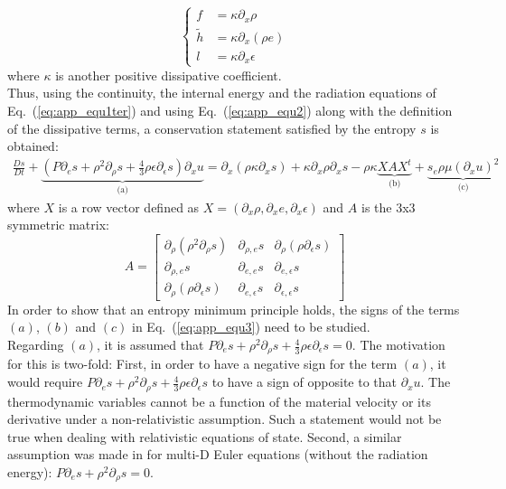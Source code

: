 \documentclass[review]{elsarticle}
\newcommand{\eqt}[1]{Eq.~(\ref{#1})}                     %
\begin{document}
\begin{appendices}
 \begin{equation}
 \left\{
 \begin{array}{ccc}
f &= \kappa \partial_x \rho \\
\tilde{h} &= \kappa \partial_x (\rho e) \\
l &= \kappa \partial_x \epsilon
 \end{array}
 \right.
 \end{equation}
 where $\kappa$ is another positive dissipative coefficient. \\
 Thus, using the continuity, the internal energy and the radiation equations of \eqt{eq:app_equ1ter} and using \eqt{eq:app_equ2} along with the definition of the dissipative terms, a conservation statement satisfied by the entropy $s$ is obtained:
 \begin{eqnarray}
 \label{eq:app_equ3}
 \frac{Ds}{Dt} + \underbrace{\left( P \partial_e s + \rho^2 \partial_{\rho} s + \frac{4}{3} \rho \epsilon \partial_{\epsilon} s \right) \partial_x u}_\textrm{(a)} = \partial_x \left( \rho \kappa \partial_x s \right) + \kappa \partial_x \rho \partial_x s - \rho \kappa \underbrace{X A X^t}_\textrm{(b)} + \underbrace{ s_e \rho \mu (\partial_x u)^2}_\textrm{(c)}
 \end{eqnarray}
 where $X$ is a row vector defined as $X=\left( \partial_x \rho, \partial_x e, \partial_x \epsilon \right)$ and $A$ is the $3$x$3$ symmetric matrix:
 \begin{equation}
 A = 
 \left[
 \begin{array}{ccc}
\partial_{\rho} \left( \rho^2 \partial_{\rho} s \right) & \partial_{\rho,e} s & \partial_{\rho} \left( \rho \partial_{\epsilon} s \right) \\
 \partial_{\rho,e} s & \partial_{e,e} s & \partial_{e,\epsilon} s \\
 \partial_{\rho} \left( \rho \partial_{\epsilon} s \right) & \partial_{e,\epsilon} s & \partial_{\epsilon,\epsilon} s
 \end{array}
 \right]
 \end{equation}
 In order to show that an entropy minimum principle holds, the signs of the terms $(a)$, $(b)$ and $(c)$ in \eqt{eq:app_equ3} need to be studied.\\
Regarding $(a)$, it is assumed that $P \partial_e s + \rho^2 \partial_{\rho} s + \frac{4}{3} \rho \epsilon \partial_{\epsilon} s=0$. The motivation for this is two-fold: First, in order to have a negative sign for the term $(a)$, it would require $P \partial_e s + \rho^2 \partial_{\rho} s + \frac{4}{3} \rho \epsilon \partial_{\epsilon} s$ to have a sign of opposite to that $\partial_x u$. The thermodynamic variables cannot be a function of the material velocity or its derivative under a non-relativistic assumption. Such a statement would not be true when dealing with relativistic equations of state. Second, a similar assumption was made in \cite{jlg} for multi-D Euler equations (without the radiation energy): $P \partial_e s + \rho^2 \partial_{\rho} s = 0$.\\

\end{appendices}
\end{document}
